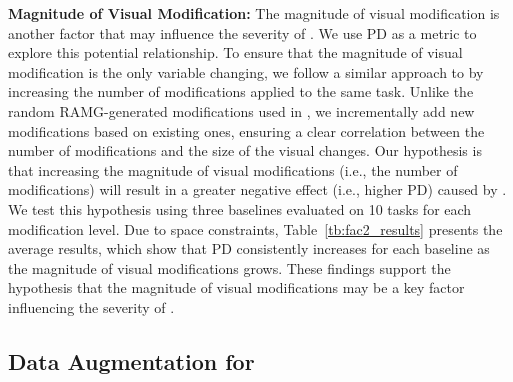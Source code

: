 \textbf{Magnitude of Visual Modification:} The magnitude of visual modification is another factor that may influence the severity of \pb. We use PD as a metric to explore this potential relationship. To ensure that the magnitude of visual modification is the only variable changing, we follow a similar approach to \bmb by increasing the number of modifications applied to the same task. Unlike the random RAMG-generated modifications used in \bmb, we incrementally add new modifications based on existing ones, ensuring a clear correlation between the number of modifications and the size of the visual changes. Our hypothesis is that increasing the magnitude of visual modifications (i.e., the number of modifications) will result in a greater negative effect (i.e., higher PD) caused by \pb. We test this hypothesis using three baselines evaluated on 10 tasks for each modification level. Due to space constraints, Table~\ref{tb:fac2_results} presents the average results, which show that PD consistently increases for each baseline as the magnitude of visual modifications grows. These findings support the hypothesis that the magnitude of visual modifications may be a key factor influencing the severity of \pb.

\subsection{Data Augmentation for \pb}
\label{subsec:results_bl}






